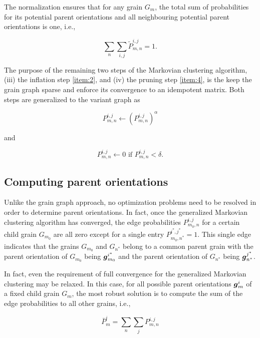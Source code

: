 \documentclass{elsarticle}
\renewcommand{\vec}[1]{\ensuremath \mathbf{\boldsymbol{#1}}}
\numberwithin{equation}{section}
\begin{document}
The normalization ensures that for any grain $G_m$, the total sum of probabilities for its potential parent orientations and all neighbouring potential parent orientations is one, i.e.,

\begin{equation*}
  \sum_n \sum_{i,j} \tilde P_{m,n}^{i,j} = 1.
\end{equation*}

The purpose of the remaining two steps of the Markovian clustering algorithm, (iii) the inflation step \ref{item:2}, and (iv) the pruning step \ref{item:4}, is the keep the grain graph sparse and enforce its convergence to an idempotent matrix. Both steps are generalized to the variant graph as 

\begin{equation*}
  P_{m,n}^{i,j} \leftarrow \left(P_{m,n}^{i,j}\right)^{\alpha}
\end{equation*}

and

\begin{equation*}
  P_{m,n}^{i,j} \leftarrow 0 \text{ if } P_{m,n}^{i,j}<\delta.
\end{equation*}



\subsection{Computing parent orientations}
\label{sec:compute-parent-or}
Unlike the grain graph approach, no optimization problems need to be resolved in order to determine parent orientations. In fact, once the generalized Markovian clustering algorithm has converged, the edge probabilities $P_{m_0,n}^{i,j}$ for a certain child grain $G_{m_0}$ are all zero except for a single entry $P_{m_0,n^*}^{i^*,j^*} = 1$. This single edge indicates that the grains $G_{m_0}$ and $G_{n^*}$ belong to a common parent grain with the parent orientation of $G_{m_0}$ being $\vec g_{m_0}^{i^*}$ and the parent orientation of $G_{n^*}$ being $\vec g_{n^*}^{j^*}$.

In fact, even the requirement of full convergence for the generalized Markovian clustering may be relaxed. In this case, for all possible parent orientations $\vec g_m^i$ of a fixed child grain $G_m$, the most robust solution is to compute the sum of the edge probabilities to all other grains, i.e.,

\begin{equation*}
  \bar P_{m}^{i}
  = \sum_n \sum _j P_{m,n}^{i,j}
\end{equation*}
\end{document}
